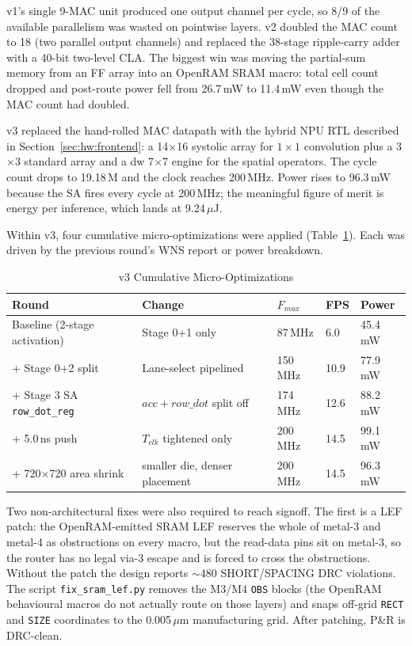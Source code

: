 v1's single 9-MAC unit produced one output channel per cycle, so 8/9 of the available parallelism was wasted on pointwise layers. v2 doubled the MAC count to 18 (two parallel output channels) and replaced the 38-stage ripple-carry adder with a 40-bit two-level CLA. The biggest win was moving the partial-sum memory from an FF array into an OpenRAM SRAM macro: total cell count dropped and post-route power fell from 26.7\,mW to 11.4\,mW even though the MAC count had doubled.

v3 replaced the hand-rolled MAC datapath with the hybrid NPU RTL described in Section~\ref{sec:hw:frontend}: a 14$\times$16 systolic array for $1\times1$ convolution plus a 3$\times$3 standard array and a dw 7$\times$7 engine for the spatial operators. The cycle count drops to 19.18\,M and the clock reaches 200\,MHz. Power rises to 96.3\,mW because the SA fires every cycle at 200\,MHz; the meaningful figure of merit is energy per inference, which lands at 9.24\,$\mu$J.

Within v3, four cumulative micro-optimizations were applied (Table~\ref{tab:v3_opt}). Each was driven by the previous round's WNS report or power breakdown.

\begin{table}[H]
\centering
\caption{v3 Cumulative Micro-Optimizations}
\label{tab:v3_opt}
\begin{tabularx}{\textwidth}{l X l l l}
\toprule
\headrow \textbf{Round} & \textbf{Change} & \textbf{$F_{max}$} & \textbf{FPS} & \textbf{Power} \\
\midrule
Baseline (2-stage activation)  & Stage 0+1 only           & 87\,MHz  & 6.0  & 45.4\,mW \\
+ Stage 0+2 split              & Lane-select pipelined    & 150\,MHz & 10.9 & 77.9\,mW \\
+ Stage 3 SA \texttt{row\_dot\_reg} & $\mathit{acc+row\_dot}$ split off & 174\,MHz & 12.6 & 88.2\,mW \\
+ 5.0\,ns push                 & $T_{clk}$ tightened only         & 200\,MHz & 14.5 & 99.1\,mW \\
+ 720$\times$720 area shrink   & smaller die, denser placement    & 200\,MHz & 14.5 & 96.3\,mW \\
\bottomrule
\end{tabularx}
\end{table}

Two non-architectural fixes were also required to reach signoff. The first is a LEF patch: the OpenRAM-emitted SRAM LEF reserves the whole of metal-3 and metal-4 as obstructions on every macro, but the read-data pins sit on metal-3, so the router has no legal via-3 escape and is forced to cross the obstructions. Without the patch the design reports $\sim$480 SHORT/SPACING DRC violations. The script \texttt{fix\_sram\_lef.py} removes the M3/M4 \texttt{OBS} blocks (the OpenRAM behavioural macros do not actually route on those layers) and snaps off-grid \texttt{RECT} and \texttt{SIZE} coordinates to the 0.005\,$\mu$m manufacturing grid. After patching, P\&R is DRC-clean.

